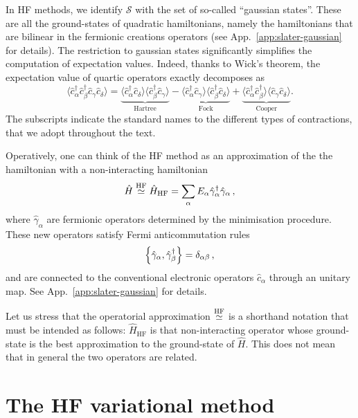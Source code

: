 In HF methods, we identify $\mathcal{S}$ with the set of so-called ``gaussian states''. These are all the ground-states of quadratic hamiltonians, namely the hamiltonians that are bilinear in the fermionic creations operators (see App.~\ref{app:slater-gaussian} for details). The restriction to gaussian states significantly simplifies the computation of expectation values. Indeed, thanks to Wick's theorem, the expectation value of quartic operators exactly decomposes as
\begin{equation}\label{eq:hf-wick-hfc}
	\langle
	\hat c_\alpha^\dagger \hat c_\beta^\dagger \hat c_\gamma \hat c_\delta
	\rangle = \underbrace{
		\langle 
		\hat c_\alpha^\dagger \hat c_\delta
		\rangle \langle	
		\hat c_\beta^\dagger \hat c_\gamma 
		\rangle
	}_{\text{Hartree}}
	- 
	\underbrace{
		\langle 
		\hat c_\alpha^\dagger \hat c_\gamma
		\rangle \langle	
		\hat c_\beta^\dagger \hat c_\delta 
		\rangle 
	}_{\text{Fock}}
	+ 
	\underbrace{
		\langle 
		\hat c_\alpha^\dagger \hat c_\beta^\dagger
		\rangle \langle	
		\hat c_\gamma \hat c_\delta 
		\rangle 
	}_{\text{Cooper}}.
\end{equation}
The subscripts indicate the standard names to the different types of contractions, that we adopt throughout the text.

Operatively, one can think of the HF method as an approximation of the the hamiltonian with a non-interacting hamiltonian
\[
	\hat H \stackrel{\mathrm{HF}}{\simeq}	\hat H_\mathrm{HF} = \sum_{\alpha} E_\alpha \hat\gamma_\alpha^\dagger \hat\gamma_\alpha \, ,
\]
where $\hat \gamma_\alpha$ are fermionic operators determined by the minimisation procedure. These new operators satisfy Fermi anticommutation rules
\[
	\acomm{\hat\gamma_\alpha}{\hat\gamma_\beta^\dagger} = \delta_{\alpha\beta} \, ,
\]
and are connected to the conventional electronic operators $\hat c_\alpha$ through an unitary map. See App.~\ref{app:slater-gaussian} for details.

Let us stress that the operatorial approximation $\stackrel{\mathrm{HF}}{\simeq}$ is a shorthand notation that must be intended as follows: $\hat H_\mathrm{HF}$ is that non-interacting operator whose ground-state is the best approximation to the ground-state of $\hat H$. This does not mean that in general the two operators are related.

\section{The HF variational method}\label{sec:sketch-hf-method}

